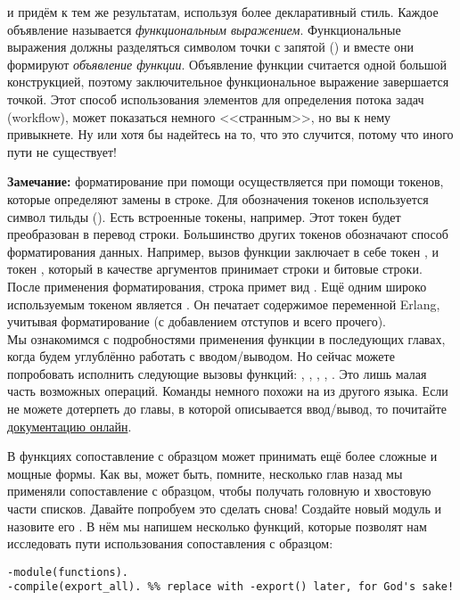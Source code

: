 и придём к тем же результатам, используя более декларативный стиль. Каждое объявление  называется \emph{функциональным выражением}. Функциональные выражения должны разделяться символом точки с запятой (\ops{;}) и вместе они формируют \emph{объявление функции}. Объявление функции считается одной большой конструкцией, поэтому заключительное функциональное выражение завершается точкой. Этот способ использования элементов для определения потока задач (workflow), может показаться немного <<странным>>, но вы к нему привыкнете. Ну или хотя бы надейтесь на то, что это случится, потому что иного пути не существует!\\
\colorbox{lgray}
{
    \begin{minipage}{1\linewidth}
        \textbf{Замечание:} форматирование при помощи  осуществляется при помощи токенов, которые определяют замены в строке. Для обозначения токенов используется символ тильды (\ops{\strut\mytilde}). Есть встроенные токены, например. Этот токен будет преобразован в перевод строки. Большинство других токенов обозначают способ форматирования данных. Например, вызов функции  заключает в себе токен , и токен , который в качестве аргументов принимает строки и битовые строки. После применения форматирования, строка примет вид . Ещё одним широко используемым токеном является . Он печатает содержимое переменной Erlang, учитывая форматирование (с добавлением отступов и всего прочего).\\ 
        Мы ознакомимся с подробностями применения функции  в последующих главах, когда будем углублённо работать с вводом/выводом. Но сейчас можете попробовать исполнить следующие вызовы функций: , , , , . Это лишь малая часть возможных операций. Команды немного похожи на  из другого языка. Если не можете дотерпеть до главы, в которой описывается ввод/вывод, то почитайте \href{http://erlang.org/doc/man/io.html\#format-3}{документацию онлайн}.
    \end{minipage}
}

В функциях сопоставление с образцом может принимать ещё более сложные и мощные формы. Как вы, может быть, помните, несколько глав назад мы применяли сопоставление с образцом, чтобы получать головную и хвостовую части списков. Давайте попробуем это сделать снова! Создайте новый модуль и назовите его . В нём мы напишем несколько функций, которые позволят нам исследовать пути использования сопоставления с образцом:
\begin{lstlisting}[style=erlang]
-module(functions).
-compile(export_all). %% replace with -export() later, for God's sake!
\end{lstlisting}

